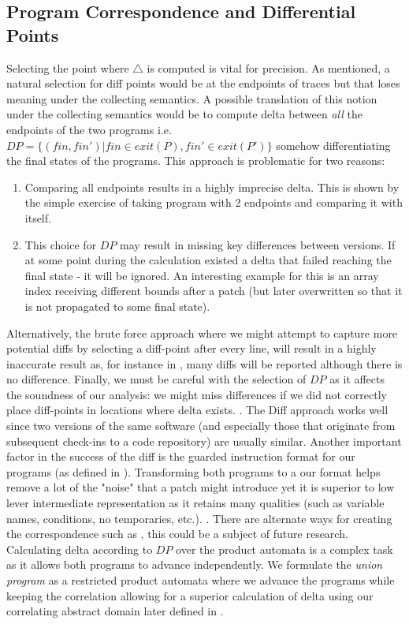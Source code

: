 \subsection{Program Correspondence and Differential Points} 
Selecting the point where $\triangle$ is computed is vital for precision. As mentioned, a natural selection for diff points would be at the endpoints of traces but that loses meaning under the collecting semantics. A possible translation of this notion under the collecting semantics would be to compute delta between \emph{all} the endpoints of the two programs i.e. $DP = \{(fin,fin') | fin \in exit(P), fin' \in exit(P') \}$ somehow differentiating the final states of the programs. This approach is problematic for two reasons:
\begin{enumerate}
\item Comparing all endpoints results in a highly imprecise delta. This is shown by the simple exercise of taking program with 2 endpoints and comparing it with itself.
\item This choice for $DP$ may result in missing key differences between versions. If at some point during the calculation existed a delta that failed reaching the final state - it will be ignored. An interesting example for this is an array index receiving different bounds after a patch (but later overwritten so that it is not propagated to some final state).
\end{enumerate}
Alternatively, the brute force approach where we might attempt to capture more potential diffs by selecting a diff-point after every line, will result in a highly inaccurate result as, for instance in , many diffs will be reported although there is no difference.
Finally, we must be careful with the selection of $DP$ as it affects the soundness of our analysis: we might miss differences if we did not correctly place diff-points in locations where delta exists.
 . The Diff approach works well since two versions of the same software (and especially those that originate from subsequent check-ins to a code repository) are usually similar. Another important factor in the success of the diff is the guarded instruction format for our programs (as defined in ). Transforming both programs to a our format helps remove a lot of the "noise" that a patch might introduce yet it is superior to low lever intermediate representation as it retains many qualities (such as variable names, conditions, no temporaries, etc.). . There are alternate ways for creating the correspondence such as , this could be a subject of future research. Calculating delta according to $DP$ over the product automata is a complex task as it allows both programs to advance independently. We formulate the \emph{union program} as a restricted product automata where we advance the programs while keeping the correlation allowing for a superior calculation of delta using our correlating abstract domain later defined in .

